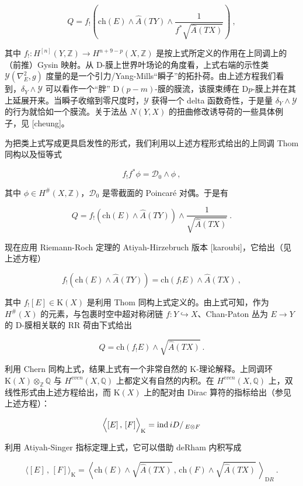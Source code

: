 \documentclass[11pt,a4paper]{ctexart}
\begin{document}
\[Q=f_{!}\left(\mathrm{ch}(E)\wedge\widehat{A}(TY)
\wedge\frac{1}{f^*\sqrt{\widehat{A}(TX)}}\right)\ ,\]

其中 \(f_!: H^[n](Y,{\mathbb{Z}})\rightarrow H^{n+9-p}(X,{\mathbb{Z}})\) 是按上式所定义的作用在上同调上的（前推）Gysin 映射。从 D-膜上世界叶场论的角度看，上式右端的示性类 \({\mathcal Y}(\nabla^2_{E},g)\) 度量的是一个引力/Yang-Mills``瞬子''的拓扑荷。由上述方程我们看到，\(\delta_Y\wedge {\mathcal Y}\) 可以看作一个``胖'' D\((p-m)\)-膜的膜流，该膜束缚在 D\(p\)-膜上并在其上延展开来。当瞬子收缩到零尺度时，\({\mathcal Y}\) 获得一个 delta 函数奇性，于是量 \(\delta_Y\wedge {\mathcal Y}\) 的行为就恰如一个膜流。关于法丛 \(N(Y,X)\) 的扭曲修改诱导荷的一些具体例子，见 [cheung]。

为把类上式写成更具启发性的形式，我们利用以上述方程形式给出的上同调 Thom 同构以及恒等式

\[f_!f^*\phi={\mathcal D}_0\wedge\phi\ ,\]

其中 \(\phi\in H^\#(X,{\mathbb{Z}})\)，\({\mathcal D}_0\) 是零截面的 Poincaré 对偶。于是有

\[Q=f_!\left(\mathrm{ch}(E)\wedge\widehat{A}(TY)\right)
\wedge\frac{1}{\sqrt{\widehat{A}(TX)}}\ .\]

现在应用 Riemann-Roch 定理的 Atiyah-Hirzebruch 版本 [karoubi]，它给出（见上述方程）

\[f_!\left(\mathrm{ch}(E)\wedge\widehat{A}(TY)\right)=
\mathrm{ch}(f_!E)\wedge\widehat{A}(TX)\ ,\]

其中 \(f_![E]\in {\mathrm K}(X)\) 是利用 Thom 同构上式定义的。由上式可知，作为 \(H^\#(X)\) 的元素，与包裹时空中超对称闭链 \(f:Y\hookrightarrow X\)、Chan-Paton 丛为 \(E\rightarrow Y\) 的 D-膜相关联的 RR 荷由下式给出

\[Q=\mathrm{ch}(f_!E)\wedge\sqrt{\widehat{A}(TX)}\ .\]

利用 Chern 同构上式，结果上式有一个非常自然的 K-理论解释。上同调环 \({\mathrm K}(X)\otimes_{\mathbb{Z}}{\mathbb{Q}}\) 与 \(H^{\mathrm even}(X,{\mathbb{Q}})\) 上都定义有自然的内积。在 \(H^{\mathrm even}(X,{\mathbb{Q}})\) 上，双线性形式由上述方程给出，而 \({\mathrm K}(X)\) 上的配对由 Dirac 算符的指标给出（参见上述方程）：

\[\Bigl\langle [E]\,,\,[F]\Bigr\rangle_{{\mathrm K}}=\mathrm{ind}\,iD/\,_{E\otimes F}\]

利用 Atiyah-Singer 指标定理上式，它可以借助 deRham 内积写成

\[\biggl\langle [E]\,,\,[F]\biggr
\rangle_{{\mathrm K}}=\left\langle\mathrm{ch}(E)\wedge\sqrt{\widehat{A}(TX)}\,,
\,\mathrm{ch}(F)\wedge\sqrt{\widehat{A}(TX)}
\,\right\rangle_{\mathrm DR}\ .\]
\end{document}
